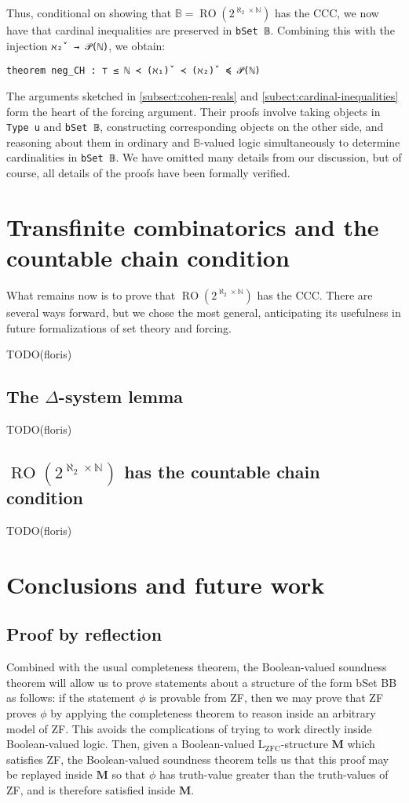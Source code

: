 \documentclass[a4paper,USenglish,cleveref, autoref]{lipics-v2019}
\newcommand{\B}{\mathbb{B}}
\newcommand{\lil}{\lstinline}
\begin{document}
Thus, conditional on showing that $\B = \operatorname{RO}(2^{\aleph_2 \times \mathbb{N}})$ has the CCC, we now have that cardinal inequalities are preserved in \lstinline{bSet 𝔹}. Combining this with the injection \lil{ℵ₂̌  → 𝒫(ℕ)}, we obtain:
\begin{lstlisting}
theorem neg_CH : ⊤ ≤ ℕ ≺ (ℵ₁)̌  ≺ (ℵ₂)̌  ≼ 𝒫(ℕ)
\end{lstlisting}

The arguments sketched in \autoref{subsect:cohen-reals} and \autoref{subect:cardinal-inequalities} form the heart of the forcing argument. Their proofs involve taking objects in \lil{Type u} and \lil{bSet 𝔹}, constructing corresponding objects on the other side, and reasoning about them in ordinary and $\B$-valued logic simultaneously to determine cardinalities in \lstinline{bSet 𝔹}. We have omitted many details from our discussion, but of course, all details of the proofs have been formally verified.

\section{Transfinite combinatorics and the countable chain condition}
\label{sect:ccc}
What remains now is to prove that $\operatorname{RO}(2^{\aleph_2 \times \mathbb{N}})$ has the CCC. There are several ways forward, but we chose the most general, anticipating its usefulness in future formalizations of set theory and forcing.

TODO(floris)
\subsection{The $\Delta$-system lemma}
TODO(floris)
\subsection{$\operatorname{RO}(2^{\aleph_2 \times \mathbb{N}})$ has the countable chain condition}
TODO(floris)

\section{Conclusions and future work}
\subsection{Proof by reflection}

Combined with the usual completeness theorem, the Boolean-valued soundness theorem will allow us to prove statements about a structure of the form bSet BB as follows: if the statement $\phi$ is provable from ZF, then we may prove that ZF proves $\phi$ by applying the completeness theorem to reason inside an arbitrary model of ZF. This avoids the complications of trying to work directly inside Boolean-valued logic. Then, given a Boolean-valued L\(_{\text{ZFC}}\)-structure $\mathbf{M}$ which satisfies ZF, the Boolean-valued soundness theorem tells us that this proof may be replayed inside $\mathbf{M}$ so that $\phi$ has truth-value greater than the truth-values of ZF, and is therefore satisfied inside $\mathbf{M}$.
\end{document}
